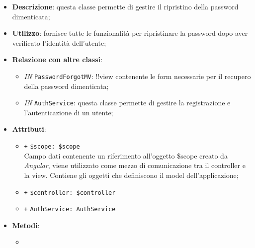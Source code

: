 \begin{itemize}
	\item \textbf{Descrizione}: questa classe permette di gestire il ripristino della password dimenticata;
	\item \textbf{Utilizzo}: fornisce tutte le funzionalità per ripristinare la password dopo aver verificato l'identità dell'utente;
	\item \textbf{Relazione con altre classi}:
	\begin{itemize}
		\item \textit{IN} \texttt{PasswordForgotMV}: !!view contenente le form necessarie per il recupero della password dimenticata; 
		\item \textit{IN} \texttt{AuthService}: questa classe permette di gestire la registrazione e l'autenticazione di un utente;
	\end{itemize}
	\item \textbf{Attributi}:
	\begin{itemize}
		\item \texttt{+} \texttt{\$scope: \$scope} \\
		Campo dati contenente un riferimento all’oggetto \$scope creato da \textit{Angular}, viene utilizzato come mezzo di comunicazione tra il controller e la view. Contiene gli oggetti che definiscono il model dell’applicazione;
		\item \texttt{+} \texttt{\$controller: \$controller} \\
		\item \texttt{+} \texttt{AuthService: AuthService} \\
	\end{itemize}
	\item \textbf{Metodi}:
	\begin{itemize}
		\item 
	\end{itemize}
\end{itemize}

